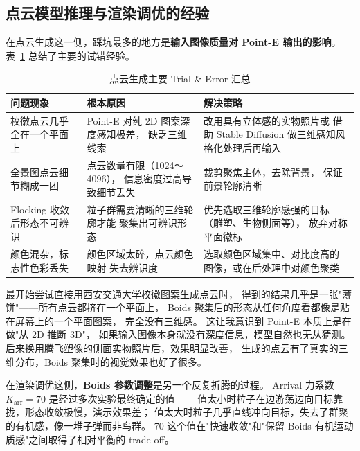 \subsection{点云模型推理与渲染调优的经验}

在点云生成这一侧，踩坑最多的地方是\textbf{输入图像质量对 Point-E 输出的影响}。
表~\ref{tab:trial_error} 总结了主要的试错经验。

\begin{table}[htbp]
  \centering
  \caption{点云生成主要 Trial \& Error 汇总}
  \label{tab:trial_error}
  \begin{tabular}{p{3cm}p{4.5cm}p{6cm}}
    \hline
    \textbf{问题现象} & \textbf{根本原因} & \textbf{解决策略} \\
    \hline
    校徽点云几乎全在一个平面上 &
      Point-E 对纯 2D 图案深度感知极差，
      缺乏三维线索 &
      改用具有立体感的实物照片或
      借助 Stable Diffusion 做三维感知风格化处理后再输入 \\
    \hline
    全景图点云细节糊成一团 &
      点云数量有限（1024～4096），
      信息密度过高导致细节丢失 &
      裁剪聚焦主体，去除背景，
      保证前景轮廓清晰 \\
    \hline
    Flocking 收敛后形态不可辨识 &
      粒子群需要清晰的三维轮廓才能
      聚集出可辨识形态 &
      优先选取三维轮廓感强的目标
      （雕塑、生物侧面等），
      放弃对称平面徽标 \\
    \hline
    颜色混杂，标志性色彩丢失 &
      颜色区域太碎，点云颜色映射
      失去辨识度 &
      选取颜色区域集中、对比度高的
      图像，或在后处理中对颜色聚类 \\
    \hline
  \end{tabular}
\end{table}

最开始尝试直接用西安交通大学校徽图案生成点云时，
得到的结果几乎是一张"薄饼"——所有点云都挤在一个平面上，
Boids 聚集后的形态从任何角度看都像是贴在屏幕上的一个平面图案，
完全没有三维感。
这让我意识到 Point-E 本质上是在做"从 2D 推断 3D"，
如果输入图像本身就没有深度信息，模型自然也无从猜测。
后来换用腾飞塑像的侧面实物照片后，效果明显改善，
生成的点云有了真实的三维分布，Boids 聚集时的视觉效果也好了很多。

在渲染调优这侧，\textbf{Boids 参数调整}是另一个反复折腾的过程。
Arrival 力系数 $K_{\mathrm{arr}}=70$ 是经过多次实验最终确定的值——
值太小时粒子在边游荡边向目标靠拢，形态收敛极慢，演示效果差；
值太大时粒子几乎直线冲向目标，失去了群聚的有机感，像一堆子弹而非鸟群。
70 这个值在"快速收敛"和"保留 Boids 有机运动质感"之间取得了相对平衡的 trade-off。

